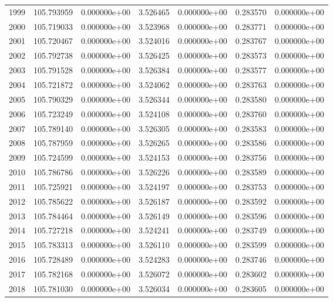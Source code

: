 \begin{tabular}{rrrrrrr}
1999 & 105.793959 &  0.000000e+00 &  3.526465 &  0.000000e+00 &    0.283570 &  0.000000e+00 \\
2000 & 105.719033 &  0.000000e+00 &  3.523968 &  0.000000e+00 &    0.283771 &  0.000000e+00 \\
2001 & 105.720467 &  0.000000e+00 &  3.524016 &  0.000000e+00 &    0.283767 &  0.000000e+00 \\
2002 & 105.792738 &  0.000000e+00 &  3.526425 &  0.000000e+00 &    0.283573 &  0.000000e+00 \\
2003 & 105.791528 &  0.000000e+00 &  3.526384 &  0.000000e+00 &    0.283577 &  0.000000e+00 \\
2004 & 105.721872 &  0.000000e+00 &  3.524062 &  0.000000e+00 &    0.283763 &  0.000000e+00 \\
2005 & 105.790329 &  0.000000e+00 &  3.526344 &  0.000000e+00 &    0.283580 &  0.000000e+00 \\
2006 & 105.723249 &  0.000000e+00 &  3.524108 &  0.000000e+00 &    0.283760 &  0.000000e+00 \\
2007 & 105.789140 &  0.000000e+00 &  3.526305 &  0.000000e+00 &    0.283583 &  0.000000e+00 \\
2008 & 105.787959 &  0.000000e+00 &  3.526265 &  0.000000e+00 &    0.283586 &  0.000000e+00 \\
2009 & 105.724599 &  0.000000e+00 &  3.524153 &  0.000000e+00 &    0.283756 &  0.000000e+00 \\
2010 & 105.786786 &  0.000000e+00 &  3.526226 &  0.000000e+00 &    0.283589 &  0.000000e+00 \\
2011 & 105.725921 &  0.000000e+00 &  3.524197 &  0.000000e+00 &    0.283753 &  0.000000e+00 \\
2012 & 105.785622 &  0.000000e+00 &  3.526187 &  0.000000e+00 &    0.283592 &  0.000000e+00 \\
2013 & 105.784464 &  0.000000e+00 &  3.526149 &  0.000000e+00 &    0.283596 &  0.000000e+00 \\
2014 & 105.727218 &  0.000000e+00 &  3.524241 &  0.000000e+00 &    0.283749 &  0.000000e+00 \\
2015 & 105.783313 &  0.000000e+00 &  3.526110 &  0.000000e+00 &    0.283599 &  0.000000e+00 \\
2016 & 105.728489 &  0.000000e+00 &  3.524283 &  0.000000e+00 &    0.283746 &  0.000000e+00 \\
2017 & 105.782168 &  0.000000e+00 &  3.526072 &  0.000000e+00 &    0.283602 &  0.000000e+00 \\
2018 & 105.781030 &  0.000000e+00 &  3.526034 &  0.000000e+00 &    0.283605 &  0.000000e+00 \\

\end{tabular}
